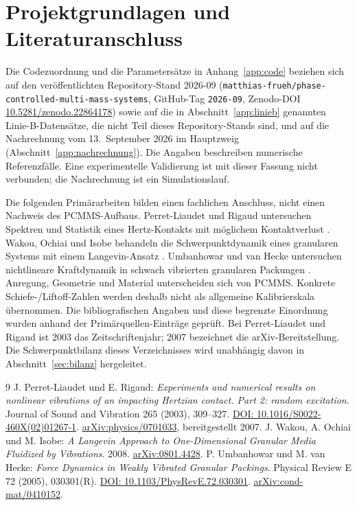\documentclass[11pt,a4paper]{article}
\begin{document}
\section{Projektgrundlagen und Literaturanschluss}\label{app:quellen}
Die Codezuordnung und die Parametersätze in Anhang~\ref{app:code} beziehen sich auf den veröffentlichten Repository-Stand 2026-09 (\texttt{matthias-frueh/phase-controlled-multi-mass-systems}, GitHub-Tag \texttt{2026-09}, Zenodo-DOI \href{https://doi.org/10.5281/zenodo.22864178}{10.5281/zenodo.22864178}) sowie auf die in Abschnitt~\ref{app:linieb} genannten Linie-B-Datensätze, die nicht Teil dieses Repository-Stands sind, und auf die Nachrechnung vom 13.~September 2026 im Hauptzweig (Abschnitt~\ref{app:nachrechnung}). Die Angaben beschreiben numerische Referenzfälle. Eine experimentelle Validierung ist mit dieser Fassung nicht verbunden; die Nachrechnung ist ein Simulationslauf.

Die folgenden Primärarbeiten bilden einen fachlichen Anschluss, nicht einen Nachweis des PCMMS-Aufbaus. Perret-Liaudet und Rigaud untersuchen Spektren und Statistik eines Hertz-Kontakts mit möglichem Kontaktverlust \cite{perret}. Wakou, Ochiai und Isobe behandeln die Schwerpunktdynamik eines granularen Systems mit einem Langevin-Ansatz \cite{wakou}. Umbanhowar und van Hecke untersuchen nichtlineare Kraftdynamik in schwach vibrierten granularen Packungen \cite{umbanhowar}. Anregung, Geometrie und Material unterscheiden sich von PCMMS. Konkrete Schiefe-/Liftoff-Zahlen werden deshalb nicht als allgemeine Kalibrierskala übernommen.
Die bibliografischen Angaben und diese begrenzte Einordnung wurden anhand der Primärquellen-Einträge geprüft. Bei Perret-Liaudet und Rigaud ist 2003 das Zeitschriftenjahr; 2007 bezeichnet die arXiv-Bereitstellung. Die Schwerpunktbilanz dieses Verzeichnisses wird unabhängig davon in Abschnitt~\ref{sec:bilanz} hergeleitet.
\begin{thebibliography}{9}
 J. Perret-Liaudet und E. Rigaud: \emph{Experiments and numerical results on nonlinear vibrations of an impacting Hertzian contact. Part 2: random excitation}. Journal of Sound and Vibration 265 (2003), 309--327. \href{https://doi.org/10.1016/S0022-460X(02)01267-1}{DOI: 10.1016/S0022-460X(02)01267-1}. \href{https://arxiv.org/abs/physics/0701033}{arXiv:physics/0701033}, bereitgestellt 2007.
 J. Wakou, A. Ochiai und M. Isobe: \emph{A Langevin Approach to One-Dimensional Granular Media Fluidized by Vibrations}. 2008. \href{https://arxiv.org/abs/0801.4428}{arXiv:0801.4428}.
 P. Umbanhowar und M. van Hecke: \emph{Force Dynamics in Weakly Vibrated Granular Packings}. Physical Review E 72 (2005), 030301(R). \href{https://doi.org/10.1103/PhysRevE.72.030301}{DOI: 10.1103/PhysRevE.72.030301}. \href{https://arxiv.org/abs/cond-mat/0410152}{arXiv:cond-mat/0410152}.
\end{thebibliography}
\end{document}
